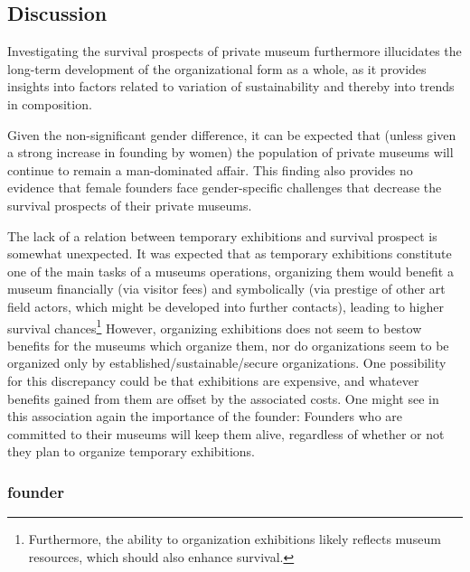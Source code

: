 \documentclass[12pt]{article}
\begin{document}
\subsection*{Discussion}



Investigating the survival prospects of private museum furthermore illucidates the long-term development of the organizational form as a whole, as it provides insights into factors related to variation of sustainability and thereby into trends in composition. 



Given the non-significant gender difference, it can be expected that (unless given a strong increase in founding by women) the population of private museums will continue to remain a man-dominated affair.
This finding also provides no evidence that female founders face gender-specific challenges that decrease the survival prospects of their private museums. 










The lack of a relation between temporary exhibitions and survival prospect is somewhat unexpected.
It was expected that as temporary exhibitions constitute one of the main tasks of a museums operations, organizing them would benefit a museum financially (via visitor fees) and symbolically (via prestige of other art field actors, which might be developed into further contacts), leading to higher survival chances\footnote{Furthermore, the ability to organization exhibitions likely reflects museum resources, which should also enhance survival.}
However, organizing exhibitions does not seem to bestow benefits for the museums which organize them, nor do organizations seem to be organized only by established/sustainable/secure organizations.
One possibility for this discrepancy could be that exhibitions are expensive, and whatever benefits gained from them are offset by the associated costs.
One might see in this association again the importance of the founder:
Founders who are committed to their museums will keep them alive, regardless of whether or not they plan to organize temporary exhibitions.







\subsubsection*{founder}
\end{document}

